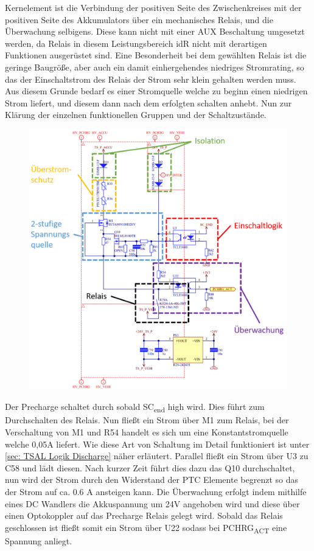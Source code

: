 Kernelement ist die Verbindung der positiven Seite des Zwischenkreises mit der positiven Seite des Akkumulators über ein mechanisches Relais, und die Überwachung selbigens. Diese kann nicht mit einer AUX Beschaltung umgesetzt werden, da Relais in diesem Leistungsbereich idR nicht mit derartigen Funktionen ausgerüstet sind. Eine Besonderheit bei dem gewählten Relais ist die geringe Baugröße, aber auch ein damit einhergehendes niedriges Stromrating, so das der Einschaltstrom des Relais der Strom sehr klein gehalten werden muss. Aus diesem Grunde bedarf es einer Stromquelle welche zu beginn einen niedrigen Strom liefert, und diesem dann nach dem erfolgten schalten anhebt. Nun zur Klärung der einzelnen funktionellen Gruppen und der Schaltzustände.

\begin{figure}
	\centering
	\includegraphics[width=0.7\linewidth]{"bilder/Precharge Blockschaltbild Detail"}
	\caption{}
	\label{fig:precharge-blockschaltbild-detail}
\end{figure}

Der Precharge schaltet durch sobald SC\textsubscript{end} high wird. Dies führt zum Durchschalten des Relais. Nun fließt ein Strom über M1 zum Relais, bei der Verschaltung von M1 und R54 handelt es sich um eine Konstantstromquelle welche 0,05A liefert. Wie diese Art von Schaltung im Detail funktioniert ist unter \ref{sec: TSAL Logik Discharge} näher erläutert. Parallel fließt ein Strom über U3 zu C58 und lädt diesen. Nach kurzer Zeit führt dies dazu das Q10 durchschaltet, nun wird der Strom durch den Widerstand der PTC Elemente begrenzt so das der Strom auf ca. 0.6 A ansteigen kann. Die Überwachung erfolgt indem mithilfe eines DC Wandlers die Akkuspannung um 24V angehoben wird und diese über einen Optokoppler auf das Precharge Relais gelegt wird. Sobald das Relais geschlossen ist fließt somit ein Strom über U22 sodass bei PCHRG\textsubscript{ACT} eine Spannung anliegt.

